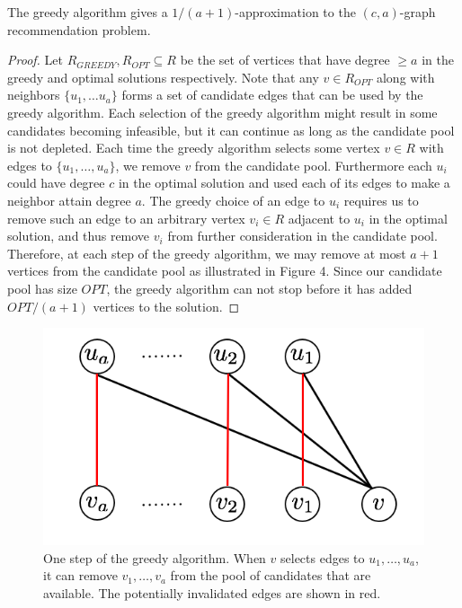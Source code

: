 \begin{thm}
The greedy algorithm gives a $1/(a+1)$-approximation to the $(c,a)$-graph
recommendation problem.
\end{thm}
\begin{proof}
Let $R_{GREEDY}, R_{OPT}\subseteq R$ be the set of vertices that have
degree $\geq a$ in the greedy and optimal solutions respectively. Note
that any $v \in R_{OPT}$ along with neighbors $\{u_1,\ldots u_a\}$
forms a set of candidate edges that can be used by the greedy
algorithm.
Each selection of the greedy algorithm might result in
some candidates becoming infeasible, but it can continue as long as the candidate pool is not depleted.
Each time the greedy algorithm selects some vertex $v\in
R$ with edges to $\{u_1,\ldots, u_a\}$, we remove $v$ from the candidate pool.
Furthermore each $u_i$ could have degree $c$ in the optimal solution and used each of its edges to make a neighbor attain degree $a$. The greedy choice of an edge to $u_i$ requires us to remove such an edge to an arbitrary vertex $v_i\in R$ adjacent to $u_i$ in the optimal
solution, and thus remove $v_i$ from further consideration in the candidate pool.
Therefore, at each step of
the greedy algorithm, we may remove at most $a+1$ vertices from
the candidate pool as illustrated in Figure 4. Since our candidate pool has size $OPT$, the
greedy algorithm can not stop before it has added $OPT/(a+1)$
vertices to the solution.
\end{proof}

\begin{figure}[H]
\label{fig:greedy}
\centering
\includegraphics[width=.39\textwidth]{images/greedy.png}
\caption{One step of the greedy algorithm. When $v$ selects edges to $u_1,\ldots, u_a$, it can remove $v_1,\ldots, v_a$ from the pool of candidates that are available. The potentially invalidated edges are shown in red.}
\end{figure}

